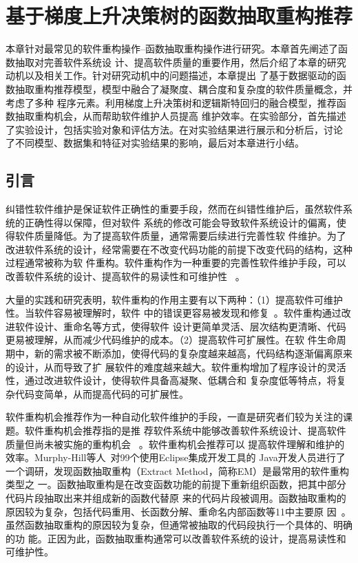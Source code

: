 

\chapter{基于梯度上升决策树的函数抽取重构推荐} 
本章针对最常见的软件重构操作--函数抽取重构操作进行研究。本章首先阐述了函数抽取对完善软件系统设
计、提高软件质量的重要作用，然后介绍了本章的研究动机以及相关工作。针对研究动机中的问题描述，本章提出
了基于数据驱动的函数抽取重构推荐模型，模型中融合了凝聚度、耦合度和复杂度的软件质量概念，并考虑了多种
程序元素。利用梯度上升决策树和逻辑斯特回归的融合模型，推荐函数抽取重构机会，从而帮助软件维护人员提高
维护效率。在实验部分，首先描述了实验设计，包括实验对象和评估方法。在对实验结果进行展示和分析后，讨论
了不同模型、数据集和特征对实验结果的影响，最后对本章进行小结。

\section{引言}
纠错性软件维护是保证软件正确性的重要手段，然而在纠错性维护后，虽然软件系统的正确性得以保障，但对软件
系统的修改可能会导致软件系统设计的偏离，使得软件质量降低。为了提高软件质量，通常需要后续进行完善性软
件维护。为了改进软件系统的设计，经常需要在不改变代码功能的前提下改变代码的结构，这种过程通常被称为软
件重构。软件重构作为一种重要的完善性软件维护手段，可以改善软件系统的设计、提高软件的易读性和可维护性
~\cite{fowler,mens:TSE04}。

大量的实践和研究表明，软件重构的作用主要有以下两种：（1）提高软件可维护性。当软件容易被理解时，软件
中的错误更容易被发现和修复~\cite{martin2009clean}。软件重构通过改进软件设计、重命名等方式，使得软件
设计更简单灵活、层次结构更清晰、代码更易被理解，从而减少代码维护的成本。（2）提高软件可扩展性。在软
件生命周期中，新的需求被不断添加，使得代码的复杂度越来越高，代码结构逐渐偏离原来的设计，从而导致了扩
展软件的难度越来越大。软件重构增加了程序设计的灵活性，通过改进软件设计，使得软件具备高凝聚、低耦合和
复杂度低等特点，将复杂代码变简单，从而提高代码的可扩展性。

软件重构机会推荐作为一种自动化软件维护的手段，一直是研究者们较为关注的课题。软件重构机会推荐指的是推
荐软件系统中能够改善软件系统设计、提高软件质量但尚未被实施的重构机会
~\cite{fokaefs:icse11,higo:JSME,Liu:IEEE-TSE:12,Tourwe:CSMR03,Tsantalis:2011}。软件重构机会推荐可以
提高软件理解和维护的效率。Murphy-Hill等人~\cite{Murphy-Hill:ICSE09}对99个使用Eclipse集成开发工具的
Java开发人员进行了一个调研，发现函数抽取重构（Extract Method，简称EM）是最常用的软件重构类型之
一。函数抽取重构是在改变函数功能的前提下重新组织函数，把其中部分代码片段抽取出来并组成新的函数代替原
来的代码片段被调用。函数抽取重构的原因较为复杂，包括代码重用、长函数分解、重命名内部函数等11中主要原
因~\cite{silva2016we}。虽然函数抽取重构的原因较为复杂，但通常被抽取的代码段执行一个具体的、明确的功
能。正因为此，函数抽取重构通常可以改善软件系统的设计，提高易读性和可维护性。

